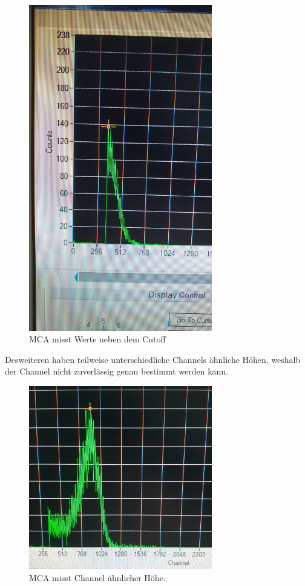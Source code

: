 \begin{figure}[H]
    \includegraphics[width=8cm]{Filter.jpg}
    \caption{MCA misst Werte neben dem Cutoff}
\end{figure}

\noindent Desweiteren haben teilweise unterschiedliche Channels ähnliche Höhen, weshalb der Channel nicht zuverlässig 
genau bestimmt werden kann. 

\begin{figure}[H]
    \includegraphics[width=8cm]{samepeaks.jpg}
    \caption{MCA misst Channel ähnlicher Höhe.}
\end{figure}

